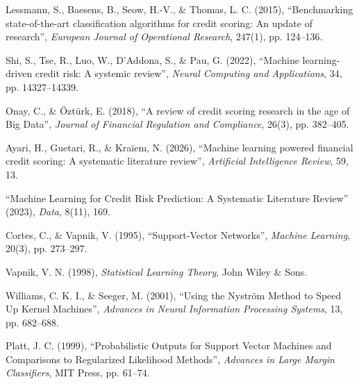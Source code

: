 \begin{enumerate}[label={[\arabic*]}, ref=\arabic*, leftmargin=*, labelsep=0.6em,
                  itemsep=5pt, start=8]

\item\label{ref:lessmann2015} Lessmann, S., Baesens, B., Seow, H.-V., \& Thomas,
L. C. (2015), ``Benchmarking state-of-the-art classification algorithms for credit
scoring: An update of research'', \textit{European Journal of Operational
Research}, 247(1), pp. 124--136.

\item\label{ref:shi2022} Shi, S., Tse, R., Luo, W., D'Addona, S., \& Pau, G.
(2022), ``Machine learning-driven credit risk: A systemic review'', \textit{Neural
Computing and Applications}, 34, pp. 14327--14339.

\item\label{ref:onay2018} Onay, C., \& Öztürk, E. (2018), ``A review of credit
scoring research in the age of Big Data'', \textit{Journal of Financial Regulation
and Compliance}, 26(3), pp. 382--405.

\item\label{ref:ayari2026} Ayari, H., Guetari, R., \& Kraïem, N. (2026),
``Machine learning powered financial credit scoring: A systematic literature
review'', \textit{Artificial Intelligence Review}, 59, 13.

\item\label{ref:data2023} ``Machine Learning for Credit Risk Prediction: A
Systematic Literature Review'' (2023), \textit{Data}, 8(11), 169.

\item\label{ref:cortes1995} Cortes, C., \& Vapnik, V. (1995), ``Support-Vector
Networks'', \textit{Machine Learning}, 20(3), pp. 273--297.

\item\label{ref:vapnik1998} Vapnik, V. N. (1998), \textit{Statistical Learning
Theory}, John Wiley \& Sons.

\item\label{ref:williams2001} Williams, C. K. I., \& Seeger, M. (2001), ``Using
the Nyström Method to Speed Up Kernel Machines'', \textit{Advances in Neural
Information Processing Systems}, 13, pp. 682--688.

\item\label{ref:platt1999} Platt, J. C. (1999), ``Probabilistic Outputs for
Support Vector Machines and Comparisons to Regularized Likelihood Methods'',
\textit{Advances in Large Margin Classifiers}, MIT Press, pp. 61--74.


\end{enumerate}

